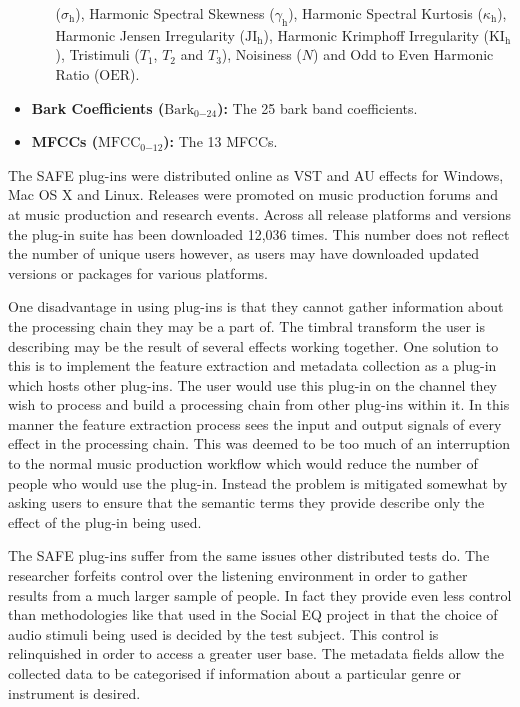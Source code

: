 \begin{itemize}
\begin{itemize}
				      ($\sigma_{\mathrm{h}}$), Harmonic Spectral Skewness ($\gamma_{\mathrm{h}}$), Harmonic
				      Spectral Kurtosis ($\kappa_{\mathrm{h}}$), Harmonic Jensen Irregularity
				      ($\mathrm{JI_{h}}$), Harmonic Krimphoff Irregularity
				      ($\mathrm{KI_{h}}$), Tristimuli ($T_{1}$, $T_{2}$ and $T_{3}$), Noisiness
				      ($N$) and Odd to Even Harmonic Ratio ($\mathrm{OER}$).
			\end{itemize}
			\item {\bf{Bark Coefficients (}}$\mathrm{Bark}_{0\mathrm{-}24}${\bf{):}} The 25 bark band
			      coefficients.
			\item {\bf{MFCCs (}}$\mathrm{MFCC}_{0\mathrm{-}12}${\bf{):}} The 13 MFCCs.
		\end{itemize}

		The SAFE plug-ins were distributed online as VST and AU effects for Windows, Mac OS X and Linux.  Releases
		were promoted on music production forums and at music production and research events. Across all release
		platforms and versions the plug-in suite has been downloaded 12,036 times. This number does not reflect the
		number of unique users however, as users may have downloaded updated versions or packages for various
		platforms.

		One disadvantage in using plug-ins is that they cannot gather information about the processing chain they
		may be a part of. The timbral transform the user is describing may be the result of several effects working
		together. One solution to this is to implement the feature extraction and metadata collection as a plug-in
		which hosts other plug-ins. The user would use this plug-in on the channel they wish to process and build a
		processing chain from other plug-ins within it. In this manner the feature extraction process sees the
		input and output signals of every effect in the processing chain. This was deemed to be too much of an
		interruption to the normal music production workflow which would reduce the number of people who would use
		the plug-in. Instead the problem is mitigated somewhat by asking users to ensure that the semantic terms
		they provide describe only the effect of the plug-in being used.

		The SAFE plug-ins suffer from the same issues other distributed tests do. The researcher forfeits control
		over the listening environment in order to gather results from a much larger sample of people. In fact they
		provide even less control than methodologies like that used in the Social EQ project
		\citep{cartwright2013socialeq} in that the choice of audio stimuli being used is decided by the test
		subject. This control is relinquished in order to access a greater user base. The metadata fields allow the
		collected data to be categorised if information about a particular genre or instrument is desired.

